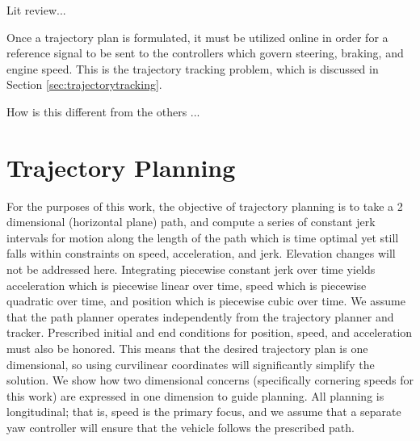 \documentclass[letterpaper, 10 pt, conference]{ieeeconf}  %
\begin{document}



Lit review...

Once a trajectory plan is formulated, it must be utilized online in order for a reference signal to be sent to the controllers which govern steering, braking, and engine speed.
This is the trajectory tracking problem, which is discussed in Section \ref{sec:trajectorytracking}.

How is this different from the others ...



\section{Trajectory Planning} \label{sec:trajectoryplanning}

For the purposes of this work, the objective of trajectory planning is to take a 2 dimensional (horizontal plane) path, and compute a series of constant jerk intervals for motion along the length of the path which is time optimal yet still falls within constraints on speed, acceleration, and jerk.
Elevation changes will not be addressed here.
Integrating piecewise constant jerk over time yields acceleration which is piecewise linear over time, speed which is piecewise quadratic over time, and position which is piecewise cubic over time.
We assume that the path planner operates independently from the trajectory planner and tracker.
Prescribed initial and end conditions for position, speed, and acceleration must also be honored. 
This means that the desired trajectory plan is one dimensional, so using curvilinear coordinates will significantly simplify the solution.
We show how two dimensional concerns (specifically cornering speeds for this work) are expressed in one dimension to guide planning.
All planning is longitudinal; that is, speed is the primary focus, and we assume that a separate yaw controller will ensure that the vehicle follows the prescribed path.
\end{document}
